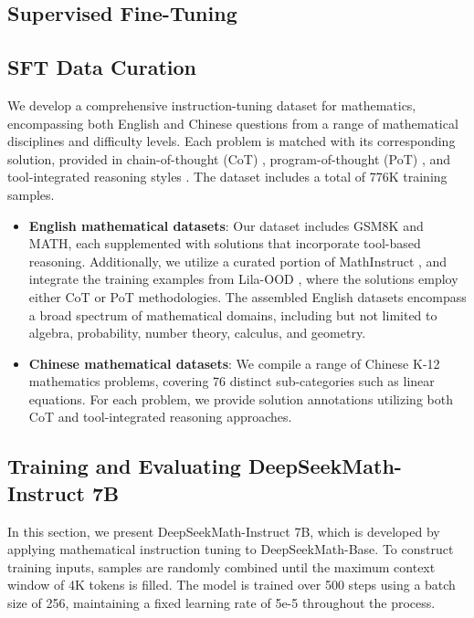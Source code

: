 \begin{itemize}[topsep=0pt]
\section{Supervised Fine-Tuning}

\subsection{SFT Data Curation}

We develop a comprehensive instruction-tuning dataset for mathematics, encompassing both English and Chinese questions from a range of mathematical disciplines and difficulty levels. Each problem is matched with its corresponding solution, provided in chain-of-thought (CoT) \citep{cot}, program-of-thought (PoT) \citep{pot,pal}, and tool-integrated reasoning styles \citep{tora}. The dataset includes a total of 776K training samples.

\begin{itemize}[topsep=0pt]
    \item \textbf{English mathematical datasets}: Our dataset includes GSM8K and MATH, each supplemented with solutions that incorporate tool-based reasoning. Additionally, we utilize a curated portion of MathInstruct \citep{MathInstruct}, and integrate the training examples from Lila-OOD \citep{lila}, where the solutions employ either CoT or PoT methodologies. The assembled English datasets encompass a broad spectrum of mathematical domains, including but not limited to algebra, probability, number theory, calculus, and geometry.
    \item \textbf{Chinese mathematical datasets}: We compile a range of Chinese K-12 mathematics problems, covering 76 distinct sub-categories such as linear equations. For each problem, we provide solution annotations utilizing both CoT and tool-integrated reasoning approaches.
\end{itemize}

\subsection{Training and Evaluating DeepSeekMath-Instruct 7B}

In this section, we present DeepSeekMath-Instruct 7B, which is developed by applying mathematical instruction tuning to DeepSeekMath-Base. To construct training inputs, samples are randomly combined until the maximum context window of 4K tokens is filled. The model is trained over 500 steps using a batch size of 256, maintaining a fixed learning rate of 5e-5 throughout the process.


\end{itemize}
